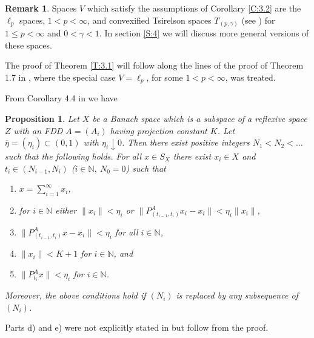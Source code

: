 \documentclass[11pt,leqno]{amsart}
\newtheorem{prop}[thm]{Proposition}
\theoremstyle{definition}
\newtheorem*{remark}{Remark}
\newcommand{\N}{\mathbb{N}}
\newcommand{\etab}{\overline\eta}
\begin{document}
\begin{remark}
  Spaces $V$ which satisfy the assumptions of Corollary \ref{C:3.2}
  are the $\ell_p$ spaces, $1<p<\infty$, and convexified  Tsirelson
  spaces $T_{(p,\gamma)}$ (see \cite{CS}) for  $1\le p<\infty$ and
  $0<\gamma<1$. In section \ref{S:4} we will discuss more general
  versions of these spaces.
\end{remark}

The proof of Theorem \ref{T:3.1}  will follow along the lines
of the proof of Theorem 1.7  in \cite{OS2}, where the special
case $V=\ell_p$, for some $1<p<\infty$, was treated.

From Corollary 4.4 in \cite{OS1} we have
\begin{prop}
  \label{P:3.4}
  Let $X$ be a Banach space which is a subspace of a reflexive space $Z$
  with an FDD  $A=(A_i)$ having projection constant $K$. Let
  $\etab=(\eta_i)\subset (0,1)$ with $\eta_i\downarrow 0$. Then there exist
  positive integers $N_1 < N_2 < \ldots$ such that the following
  holds. For all $x\in S_X$ there exist $x_i \in X$ and $t_i\in
  (N_{i-1},N_i)$ ($i\in\N,\ N_0=0$) such that
  \begin{enumerate}
  \item[{a)}] $x = \sum\limits_{i=1}^\infty x_i$,
  \item[{b)}] for $i\in\N$ either $\|x_i\| <\eta_i$ or
    $\|P_{(t_{i-1},t_i)}^A x_i - x_i\| < \eta_i \|x_i\|$,
  \item[{c)}] $\|P_{(t_{i-1},t_i)}^A x-x_i\| < \eta_i$ for all $i\in\N$,
  \item[{d)}] $\|x_i\| < K+1$ for $i\in\N$, and
  \item[{e)}] $\|P_{t_i}^A x\| < \eta_i$ for $i\in\N$.
  \end{enumerate}
  Moreover, the above conditions hold if $(N_i)$ is replaced by any
  subsequence of $(N_i)$.
\end{prop}
Parts d) and e) were not explicitly stated in \cite{OS1} but follow from
the proof.
\end{document}
